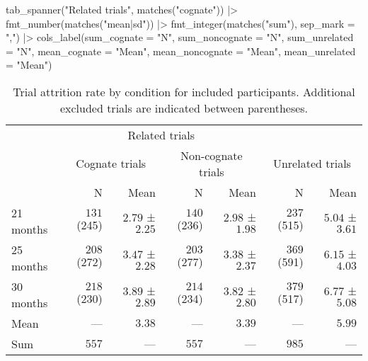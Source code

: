 \documentclass[
  letterpaper,
  DIV=11,
  numbers=noendperiod]{scrartcl}
\newenvironment{Shaded}{\begin{snugshade}}{\end{snugshade}}
\newcommand{\AttributeTok}[1]{\textcolor[rgb]{0.40,0.45,0.13}{#1}}
\newcommand{\FunctionTok}[1]{\textcolor[rgb]{0.28,0.35,0.67}{#1}}
\newcommand{\NormalTok}[1]{\textcolor[rgb]{0.00,0.23,0.31}{#1}}
\newcommand{\SpecialCharTok}[1]{\textcolor[rgb]{0.37,0.37,0.37}{#1}}
\newcommand{\StringTok}[1]{\textcolor[rgb]{0.13,0.47,0.30}{#1}}
\begin{document}
\begin{Shaded}
\begin{Highlighting}[]
    \FunctionTok{tab\_spanner}\NormalTok{(}\StringTok{"Related trials"}\NormalTok{, }\FunctionTok{matches}\NormalTok{(}\StringTok{"cognate"}\NormalTok{)) }\SpecialCharTok{|\textgreater{}}
    \FunctionTok{fmt\_number}\NormalTok{(}\FunctionTok{matches}\NormalTok{(}\StringTok{"mean|sd"}\NormalTok{)) }\SpecialCharTok{|\textgreater{}} 
    \FunctionTok{fmt\_integer}\NormalTok{(}\FunctionTok{matches}\NormalTok{(}\StringTok{"sum"}\NormalTok{), }\AttributeTok{sep\_mark =} \StringTok{","}\NormalTok{) }\SpecialCharTok{|\textgreater{}} 
    \FunctionTok{cols\_label}\NormalTok{(}\AttributeTok{sum\_cognate =} \StringTok{"N"}\NormalTok{,}
               \AttributeTok{sum\_noncognate =} \StringTok{"N"}\NormalTok{,}
               \AttributeTok{sum\_unrelated =} \StringTok{"N"}\NormalTok{,}
               \AttributeTok{mean\_cognate =} \StringTok{"Mean"}\NormalTok{,}
               \AttributeTok{mean\_noncognate =} \StringTok{"Mean"}\NormalTok{,}
               \AttributeTok{mean\_unrelated =} \StringTok{"Mean"}\NormalTok{)}
\end{Highlighting}
\end{Shaded}

\hypertarget{tbl-attrition-trials}{}
\begin{longtable}{l|rrrrrr}
\caption{\label{tbl-attrition-trials}Trial attrition rate by condition for included participants. Additional
excluded trials are indicated between parentheses. }\tabularnewline

\toprule
\multicolumn{1}{l}{} & \multicolumn{4}{c}{Related trials} &  &  \\ 
\cmidrule(lr){2-5}
\multicolumn{1}{l}{} & \multicolumn{2}{c}{Cognate trials} & \multicolumn{2}{c}{Non-cognate trials} & \multicolumn{2}{c}{Unrelated trials} \\ 
\cmidrule(lr){2-3} \cmidrule(lr){4-5} \cmidrule(lr){6-7}
\multicolumn{1}{l}{} & N & Mean & N & Mean & N & Mean \\ 
\midrule
21 months & $131$ (245) & $2.79$ ± $2.25$ & $140$ (236) & $2.98$ ± $1.98$ & $237$ (515) & $5.04$ ± $3.61$ \\ 
25 months & $208$ (272) & $3.47$ ± $2.28$ & $203$ (277) & $3.38$ ± $2.37$ & $369$ (591) & $6.15$ ± $4.03$ \\ 
30 months & $218$ (230) & $3.89$ ± $2.89$ & $214$ (234) & $3.82$ ± $2.80$ & $379$ (517) & $6.77$ ± $5.08$ \\ 
\midrule 
\midrule 
Mean & — & $3.38$ & — & $3.39$ & — & $5.99$ \\ 
Sum & $557$ & — & $557$ & — & $985$ & — \\ 
\bottomrule
\end{longtable}
\end{document}
